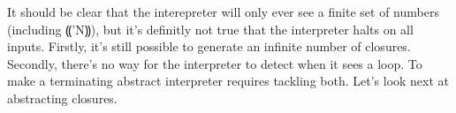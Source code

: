 It should be clear that the interepreter will only ever see a finite set of
numbers (including ⸨'N⸩), but it's definitly not true that the interpreter
halts on all inputs.  Firstly, it's still possible to generate an infinite
number of closures.  Secondly, there's no way for the interpreter to detect
when it sees a loop.  To make a terminating abstract interpreter requires
tackling both.  Let's look next at abstracting closures.
